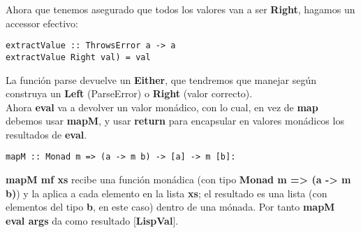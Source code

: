 Ahora que tenemos asegurado que todos los valores van a ser \textbf{Right}, hagamos un accessor
efectivo:\\

\begin{minipage}{\linewidth}
\begin{small}
\begin{lstlisting}[frame=single]
extractValue :: ThrowsError a -> a
extractValue Right val) = val
\end{lstlisting}
\end{small}
\end{minipage}

La funci\'on parse devuelve un \textbf{Either}, que tendremos que manejar seg\'un construya un \textbf{Left} (ParseError) o \textbf{Right} (valor correcto).\\

Ahora \textbf{eval} va a devolver un valor mon\'adico, con lo cual, en vez de \textbf{map} debemos usar \textbf{mapM}, y usar \textbf{return} para encapsular en valores mon\'adicos los resultados de \textbf{eval}.\\

\begin{minipage}{\linewidth}
\begin{small}
\begin{lstlisting}[frame=single]
mapM :: Monad m => (a -> m b) -> [a] -> m [b]:
\end{lstlisting}
\end{small}
\end{minipage}

\textbf{mapM mf xs} recibe una funci\'on mon\'adica (con tipo \textbf{Monad m => (a -> m b)}) y la aplica a cada elemento en la lista \textbf{xs}; el resultado es una lista (con elementos del tipo \textbf{b}, en este caso) dentro de una m\'onada. Por tanto \textbf{mapM eval args} da como resultado [\textbf{LispVal}].\\

